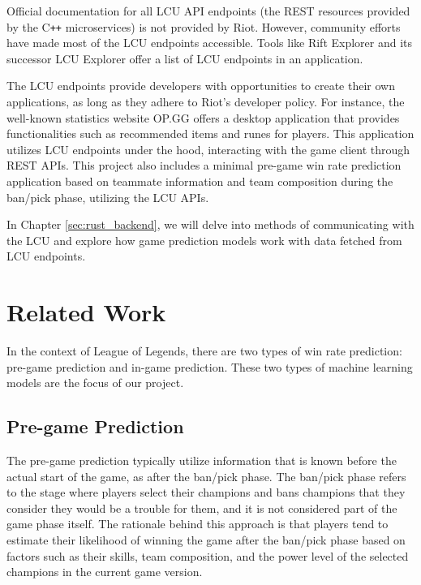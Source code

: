 \documentclass[11pt,a4paper,oneside]{report}
\begin{document}
Official documentation for all LCU API endpoints (the REST resources provided by the C\texttt{++} microservices) is not provided by Riot. However, community efforts have made most of the LCU endpoints accessible. Tools like Rift Explorer \cite{pupix} and its successor LCU Explorer \cite{hextech-docs} offer a list of LCU endpoints in an application.

The LCU endpoints provide developers with opportunities to create their own applications, as long as they adhere to Riot's developer policy. For instance, the well-known statistics website OP.GG offers a desktop application that provides functionalities such as recommended items and runes for players. This application utilizes LCU endpoints under the hood, interacting with the game client through REST APIs. This project also includes a minimal pre-game win rate prediction application based on teammate information and team composition during the ban/pick phase, utilizing the LCU APIs.

In Chapter \ref{sec:rust_backend}, we will delve into methods of communicating with the LCU and explore how game prediction models work with data fetched from LCU endpoints.


\section{Related Work}
\label{sec:related_work}

In the context of League of Legends, there are two types of win rate prediction: pre-game prediction and in-game prediction. These two types of machine learning models are the focus of our project.

\subsection{Pre-game Prediction}

The pre-game prediction typically utilize information that is known before the actual start of the game, as after the ban/pick phase. The ban/pick phase refers to the stage where players select their champions and bans champions that they consider they would be a trouble for them, and it is not considered part of the game phase itself. The rationale behind this approach is that players tend to estimate their likelihood of winning the game after the ban/pick phase based on factors such as their skills, team composition, and the power level of the selected champions in the current game version.
\end{document}
